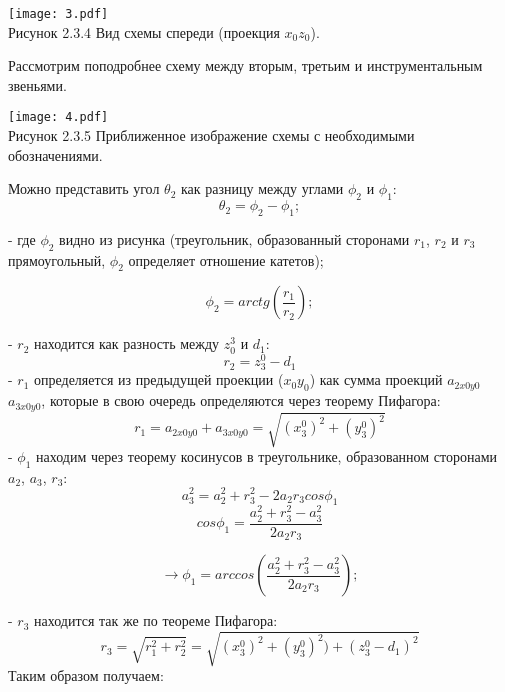 \begin{enumerate}
\begin{center}
    \texttt{[image: 3.pdf]}\\
     Рисунок 2.3.4 Вид схемы спереди (проекция $x_0z_0$).\\
\end{center}

Рассмотрим поподробнее схему между вторым, третьим и инструментальным звеньями.\\

\begin{center}
    \texttt{[image: 4.pdf]}\\
         Рисунок 2.3.5 Приближенное изображение схемы с необходимыми обозначениями. \\

\end{center}

Можно представить угол $\theta_2$ как разницу между углами $\phi_2$ и $\phi_1$:\\

\begin{equation}
    \theta_2 = \phi_2 - \phi_1;
\end{equation}

- где $\phi_2$ видно из рисунка (треугольник, образованный сторонами $r_1$, $r_2$ и $r_3$ прямоугольный, $\phi_2$ определяет отношение катетов);

\begin{equation}
    \phi_2 = arctg(\frac{r_1}{r_2});
\end{equation}

- $r_2$ находится как разность между $z_0^3$ и $d_1$: \\
$$r_2=z_3^0 - d_1$$
- $r_1$ определяется из предыдущей проекции ($x_0y_0$) как сумма проекций $a_{2x0y0}$ $a_{3x0y0}$, которые в свою очередь определяются через теорему Пифагора:\\ $$r_1=a_{2x0y0}+a_{3x0y0}=\sqrt{(x_3^0)^2+(y_3^0)^2}$$
- $\phi_1$ находим через теорему косинусов в треугольнике, образованном сторонами $a_2$, $a_3$, $r_3$:\\
$$a_3^2 = a_2^2 + r_3^2 - 2 a_2 r_3 cos\phi_1$$
$$cos\phi_1 = \frac{a_2^2 + r_3^2 - a_3^2}{2 a_2 r_3} $$

\begin{equation}
    \rightarrow \phi_1 = arccos(\frac{a_2^2 + r_3^2 - a_3^2}{2 a_2 r_3});
\end{equation}

- $r_3$ находится так же по теореме Пифагора:\\
$$r_3=\sqrt{r_1^2+r_2^2}=\sqrt{(x_3^0)^2+(y_3^0)^2)+(z_3^0 - d_1)^2}$$
Таким образом получаем:\\


\end{enumerate}
